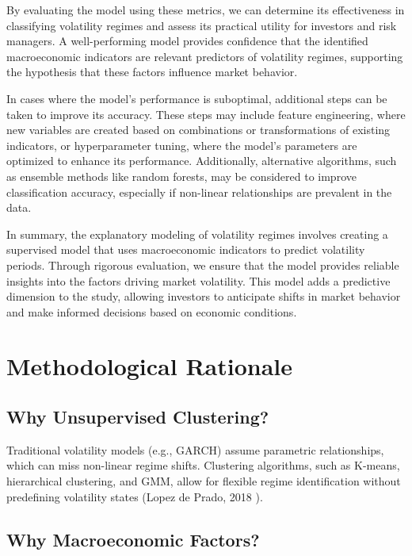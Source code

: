 By evaluating the model using these metrics, we can determine its effectiveness in classifying volatility regimes and assess its practical utility for investors and risk managers. A well-performing model provides confidence that the identified macroeconomic indicators are relevant predictors of volatility regimes, supporting the hypothesis that these factors influence market behavior.

In cases where the model’s performance is suboptimal, additional steps can be taken to improve its accuracy. These steps may include feature engineering, where new variables are created based on combinations or transformations of existing indicators, or hyperparameter tuning, where the model’s parameters are optimized to enhance its performance. Additionally, alternative algorithms, such as ensemble methods like random forests, may be considered to improve classification accuracy, especially if non-linear relationships are prevalent in the data.

In summary, the explanatory modeling of volatility regimes involves creating a supervised model that uses macroeconomic indicators to predict volatility periods. Through rigorous evaluation, we ensure that the model provides reliable insights into the factors driving market volatility. This model adds a predictive dimension to the study, allowing investors to anticipate shifts in market behavior and make informed decisions based on economic conditions.

\section{Methodological Rationale}

\subsection{Why Unsupervised Clustering?}

Traditional volatility models (e.g., GARCH) assume parametric relationships, which can miss non-linear regime shifts. Clustering algorithms, such as K-means, hierarchical clustering, and GMM, allow for flexible regime identification without predefining volatility states (Lopez de Prado, 2018 \cite{lopez_de_prado_2018}).

\subsection{Why Macroeconomic Factors?}

